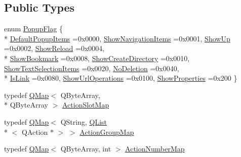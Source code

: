 \subsection*{Public Types}
\begin{DoxyCompactItemize}
\item 
enum \hyperlink{classKParts_1_1BrowserExtension_ae5b9acf92e7d83faf5142597371ef1e3}{Popup\+Flag} \{ \\*
\hyperlink{classKParts_1_1BrowserExtension_ae5b9acf92e7d83faf5142597371ef1e3a59ee58fca9e8b900d617c4f232b497f7}{Default\+Popup\+Items} =0x0000, 
\hyperlink{classKParts_1_1BrowserExtension_ae5b9acf92e7d83faf5142597371ef1e3a05faf3d46fca9da3a396d72c993eec5c}{Show\+Navigation\+Items} =0x0001, 
\hyperlink{classKParts_1_1BrowserExtension_ae5b9acf92e7d83faf5142597371ef1e3af6030e3884ded53eace393f2af510c68}{Show\+Up} =0x0002, 
\hyperlink{classKParts_1_1BrowserExtension_ae5b9acf92e7d83faf5142597371ef1e3a97cbb12bbef8ef52b233c24d0bf3e41e}{Show\+Reload} =0x0004, 
\\*
\hyperlink{classKParts_1_1BrowserExtension_ae5b9acf92e7d83faf5142597371ef1e3ac6c783f725ac9fe594d0b563495feb64}{Show\+Bookmark} =0x0008, 
\hyperlink{classKParts_1_1BrowserExtension_ae5b9acf92e7d83faf5142597371ef1e3a152988520c15f75baddf48de43c9092a}{Show\+Create\+Directory} =0x0010, 
\hyperlink{classKParts_1_1BrowserExtension_ae5b9acf92e7d83faf5142597371ef1e3a947c452c66b8c500ac2ce303451d68c4}{Show\+Text\+Selection\+Items} =0x0020, 
\hyperlink{classKParts_1_1BrowserExtension_ae5b9acf92e7d83faf5142597371ef1e3a2332ecaf86d9179ba1ba92b9b3b10463}{No\+Deletion} =0x0040, 
\\*
\hyperlink{classKParts_1_1BrowserExtension_ae5b9acf92e7d83faf5142597371ef1e3a0521ef0fcccfba841ae8c5ae373f8976}{Is\+Link} =0x0080, 
\hyperlink{classKParts_1_1BrowserExtension_ae5b9acf92e7d83faf5142597371ef1e3a40232b7894e5aa48029559354b84aeb5}{Show\+Url\+Operations} =0x0100, 
\hyperlink{classKParts_1_1BrowserExtension_ae5b9acf92e7d83faf5142597371ef1e3a12a41a796fe0be4f8411259b7a77920d}{Show\+Properties} =0x200
 \}
\item 
typedef \hyperlink{classQMap}{Q\+Map}$<$ Q\+Byte\+Array, \\*
Q\+Byte\+Array $>$ \hyperlink{classKParts_1_1BrowserExtension_ac931bbd8189a4386b609180b5e704344}{Action\+Slot\+Map}
\item 
typedef \hyperlink{classQMap}{Q\+Map}$<$ Q\+String, \hyperlink{classQList}{Q\+List}\\*
$<$ Q\+Action $\ast$ $>$ $>$ \hyperlink{classKParts_1_1BrowserExtension_a73ab162c395443c0227946524a8ee04c}{Action\+Group\+Map}
\item 
typedef \hyperlink{classQMap}{Q\+Map}$<$ Q\+Byte\+Array, int $>$ \hyperlink{classKParts_1_1BrowserExtension_a71369db13dead055035067d4f8ff498d}{Action\+Number\+Map}
\end{DoxyCompactItemize}
